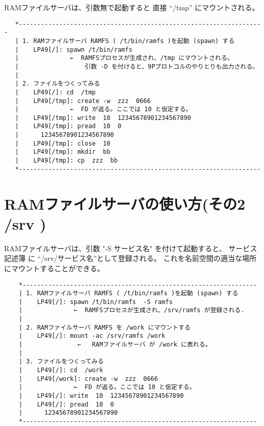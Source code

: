       RAMファイルサーバは、引数無で起動すると 直接 ``/tmp'' にマウントされる。

\begin{verbatim}
   *-------------------------------------------------------------------
   | 1. RAMファイルサーバ RAMFS ( /t/bin/ramfs )を起動 (spawn) する          
   |    LP49[/]: spawn /t/bin/ramfs                                          
   |              ←  RAMFSプロセスが生成され、/tmp にマウントされる。        
   |                  引数 -D を付けると、9Pプロトコルのやりとりも出力される。
   |
   | 2. ファイルをつくってみる                                                
   |    LP49[/]: cd  /tmp                                                     
   |    LP49[/tmp]: create -w  zzz  0666                                      
   |              ←  FD が返る。ここでは 10 と仮定する。                      
   |    LP49[/tmp]: write  10  12345678901234567890                           
   |    LP49[/tmp]: pread  10  0                                              
   |      12345678901234567890                                                
   |    LP49[/tmp]: close  10                                                 
   |    LP49[/tmp]: mkdir  bb                                                 
   |    LP49[/tmp]: cp  zzz  bb                                               
   *------------------------------------------------------------------
\end{verbatim}


\section{RAMファイルサーバの使い方(その2  /srv )}

       RAMファイルサーバは、引数 "-S サービス名" を付けて起動すると、
       サービス記述簿 に ``/srv/サービス名''として登録される。 
       これを名前空間の適当な場所にマウントすることができる。

\begin{verbatim}
    *----------------------------------------------------------------
    | 1. RAMファイルサーバ RAMFS ( /t/bin/ramfs )を起動 (spawn) する   
    |    LP49[/]: spawn /t/bin/ramfs  -S ramfs                           
    |              ←  RAMFSプロセスが生成され、/srv/ramfs が登録される.
    |
    | 2. RAMファイルサーバ RAMFS を /work にマウントする               
    |    LP49[/]: mount -ac /srv/ramfs /work                           
    |               ←   RAMファイルサーバ が /work に表れる。          
    |
    | 3. ファイルをつくってみる                                        
    |    LP49[/]: cd  /work                                            
    |    LP49[/work]: create -w  zzz  0666                             
    |              ←  FD が返る。ここでは 10 と仮定する。              
    |    LP49[/]: write  10  12345678901234567890                      
    |    LP49[/]: pread  10  0                                         
    |      12345678901234567890                                        
    *----------------------------------------------------------------
\end{verbatim}

